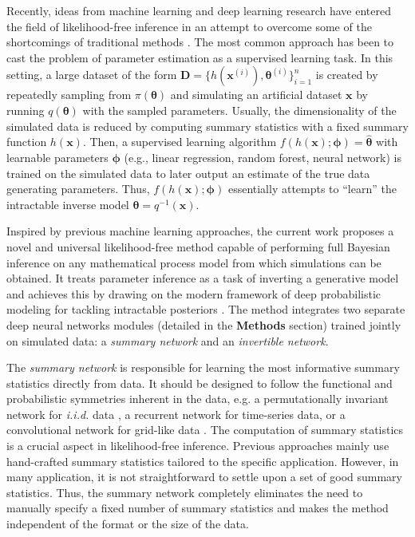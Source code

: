 \documentclass[9pt,twoside,lineno]{pnas-new}
\begin{document}
Recently, ideas from machine learning and deep learning research have entered the field of likelihood-free inference in an attempt to overcome some of the shortcomings of traditional methods \cite{radev2019towards, hwang2018conditional, mestdagh2018prepaid, raynal2018abc, jiang2017learning, lueckmann2017flexible, papamakarios2016fast}. The most common approach has been to cast the problem of parameter estimation as a supervised learning task. In this setting, a large dataset of the form $\boldsymbol{D} = \{h(\boldsymbol{x}^{(i)}), \boldsymbol{\theta}^{(i)}\}_{i=1}^{n}$ is created by repeatedly sampling from $\pi(\boldsymbol{\theta})$ and simulating an artificial dataset $\boldsymbol{x}$ by running $q(\boldsymbol{\theta})$ with the sampled parameters. Usually, the dimensionality of the simulated data is reduced by computing summary statistics  with a fixed summary function $h(\boldsymbol{x})$. Then, a supervised learning algorithm $f(h(\boldsymbol{x});\boldsymbol{\phi}) = \widehat{\boldsymbol{\theta}}$ with learnable parameters $\boldsymbol{\phi}$ (e.g., linear regression, random forest, neural network) is trained on the simulated data to later output an estimate of the true data generating parameters. Thus, $f(h(\boldsymbol{x});\boldsymbol{\phi})$ essentially attempts to “learn” the intractable inverse model $\boldsymbol{\theta} = q^{-1}(\boldsymbol{x})$.

Inspired by previous machine learning approaches, the current work proposes a novel and universal likelihood-free method capable of performing full Bayesian inference on any mathematical process model from which simulations can be obtained. It treats parameter inference as a task of inverting a generative model and achieves this by drawing on the modern framework of deep probabilistic modeling for tackling intractable posteriors \cite{ardizzone2018analyzing, kingma2018glow, grover2018flow, dinh2016density}. The method integrates two separate deep neural networks modules (detailed in the \textbf{Methods} section) trained jointly on simulated data: a \textit{summary network} and an \textit{invertible network}. 

The \textit{summary network} is responsible for learning the most informative summary statistics directly from data. It should be designed to follow the functional and probabilistic symmetries inherent in the data, e.g. a permutationally invariant network for \textit{i.i.d.} data \cite{bloem2019probabilistic}, a recurrent network for time-series data, or a convolutional network for grid-like data \cite{goodfellow2016deep}. The computation of summary statistics is a crucial aspect in likelihood-free inference. Previous approaches mainly use hand-crafted summary statistics tailored to the specific application. However, in many application, it is not straightforward to settle upon a set of good summary statistics. Thus, the summary network completely eliminates the need to manually specify a fixed number of summary statistics and makes the method independent of the format or the size of the data.
\end{document}
